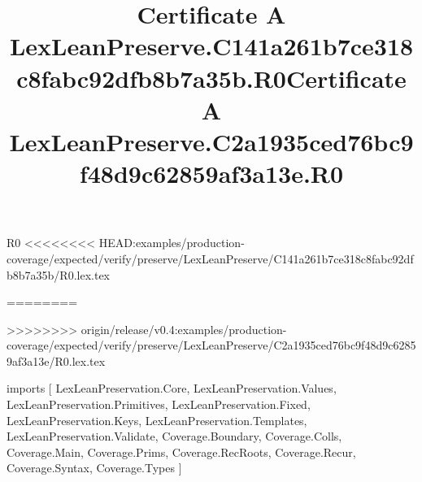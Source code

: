 \begin{lexlean}{R0}
<<<<<<<< HEAD:examples/production-coverage/expected/verify/preserve/LexLeanPreserve/C141a261b7ce318c8fabc92dfb8b7a35b/R0.lex.tex
\title{Certificate A LexLeanPreserve.C141a261b7ce318c8fabc92dfb8b7a35b.R0}
========
\title{Certificate A LexLeanPreserve.C2a1935ced76bc9f48d9c62859af3a13e.R0}
>>>>>>>> origin/release/v0.4:examples/production-coverage/expected/verify/preserve/LexLeanPreserve/C2a1935ced76bc9f48d9c62859af3a13e/R0.lex.tex
\begin{coremodule}
imports [
  LexLeanPreservation.Core,
  LexLeanPreservation.Values,
  LexLeanPreservation.Primitives,
  LexLeanPreservation.Fixed,
  LexLeanPreservation.Keys,
  LexLeanPreservation.Templates,
  LexLeanPreservation.Validate,
  Coverage.Boundary,
  Coverage.Colls,
  Coverage.Main,
  Coverage.Prims,
  Coverage.RecRoots,
  Coverage.Recur,
  Coverage.Syntax,
  Coverage.Types
]


\end{coremodule}
\end{lexlean}
